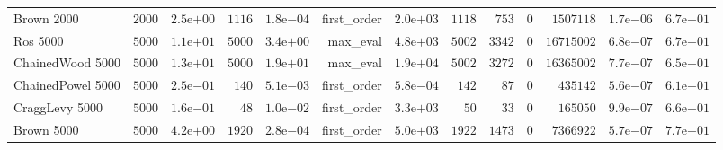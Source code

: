 \begin{longtable}[c]{lrrrrrrrrrrrr}
Brown 2000 & \( 2000\) & \( 2.5\)e\(+00\) & \( 1116\) & \( 1.8\)e\(-04\) & first\_order & \( 2.0\)e\(+03\) & \( 1118\) & \(  753\) & \(    0\) & \(1507118\) & \( 1.7\)e\(-06\) & \( 6.7\)e\(+01\) \\
Ros 5000 & \( 5000\) & \( 1.1\)e\(+01\) & \( 5000\) & \( 3.4\)e\(+00\) & max\_eval & \( 4.8\)e\(+03\) & \( 5002\) & \( 3342\) & \(    0\) & \(16715002\) & \( 6.8\)e\(-07\) & \( 6.7\)e\(+01\) \\
ChainedWood 5000 & \( 5000\) & \( 1.3\)e\(+01\) & \( 5000\) & \( 1.9\)e\(+01\) & max\_eval & \( 1.9\)e\(+04\) & \( 5002\) & \( 3272\) & \(    0\) & \(16365002\) & \( 7.7\)e\(-07\) & \( 6.5\)e\(+01\) \\
ChainedPowel 5000 & \( 5000\) & \( 2.5\)e\(-01\) & \(  140\) & \( 5.1\)e\(-03\) & first\_order & \( 5.8\)e\(-04\) & \(  142\) & \(   87\) & \(    0\) & \(435142\) & \( 5.6\)e\(-07\) & \( 6.1\)e\(+01\) \\
CraggLevy 5000 & \( 5000\) & \( 1.6\)e\(-01\) & \(   48\) & \( 1.0\)e\(-02\) & first\_order & \( 3.3\)e\(+03\) & \(   50\) & \(   33\) & \(    0\) & \(165050\) & \( 9.9\)e\(-07\) & \( 6.6\)e\(+01\) \\
Brown 5000 & \( 5000\) & \( 4.2\)e\(+00\) & \( 1920\) & \( 2.8\)e\(-04\) & first\_order & \( 5.0\)e\(+03\) & \( 1922\) & \( 1473\) & \(    0\) & \(7366922\) & \( 5.7\)e\(-07\) & \( 7.7\)e\(+01\) \\
\hline 
\end{longtable}



